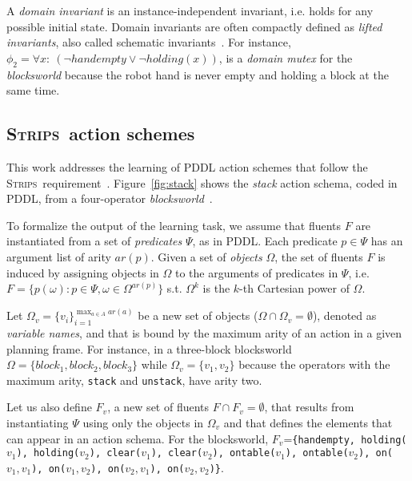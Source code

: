 \documentclass{article}
\newcommand{\strips}{\textsc{Strips}}     %
\begin{document}
A {\em domain invariant} is an instance-independent invariant, i.e. holds for any possible initial state. Domain invariants are often compactly defined as {\em lifted invariants}, also called schematic invariants~\cite{rintanen:schematicInvariants:AAAI2017}. For instance, $\phi_2=\forall x:\ (\neg handempty\vee \neg holding(x))$, is a {\em domain mutex} for the {\em blocksworld} because the robot hand is never empty and holding a block at the same time. %


\subsection{\strips\ action schemes}
This work addresses the learning of PDDL action schemes that follow the \strips\ requirement~\cite{mcdermott1998pddl,fox2003pddl2}. Figure~\ref{fig:stack} shows the {\em stack} action schema, coded in PDDL, from a four-operator {\em blocksworld}~\cite{slaney2001blocks}.

To formalize the output of the learning task, we assume that fluents $F$ are instantiated from a set of {\em predicates} $\Psi$, as in PDDL. Each predicate $p\in\Psi$ has an argument list of arity $ar(p)$. Given a set of {\em objects} $\Omega$, the set of fluents $F$ is induced by assigning objects in $\Omega$ to the arguments of predicates in $\Psi$, i.e.~$F=\{p(\omega):p\in\Psi,\omega\in\Omega^{ar(p)}\}$ s.t. $\Omega^k$ is the $k$-th Cartesian power of $\Omega$.

Let $\Omega_v=\{v_i\}_{i=1}^{\operatorname*{max}_{a\in A} ar(a)}$ be a new set of objects ($\Omega\cap\Omega_v=\emptyset$), denoted as {\em variable names}, and that is bound by the maximum arity of an action in a given planning frame. For instance, in a three-block blocksworld $\Omega=\{block_1, block_2, block_3\}$ while $\Omega_v=\{v_1, v_2\}$ because the operators with the maximum arity, {\small\tt stack} and {\small\tt unstack}, have arity two.

Let us also define $F_v$, a new set of fluents $F\cap F_v=\emptyset$, that results from instantiating $\Psi$ using only the objects in $\Omega_v$ and that defines the elements that can appear in an action schema. For the blocksworld, $F_v$={\small\tt\{handempty, holding($v_1$), holding($v_2$), clear($v_1$), clear($v_2$), ontable($v_1$), ontable($v_2$), on($v_1,v_1$), on($v_1,v_2$), on($v_2,v_1$), on($v_2,v_2$)\}}.
\end{document}
